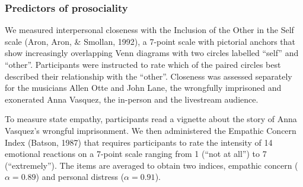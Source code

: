 \documentclass[
  man,floatsintext]{apa6}
\begin{document}
\subsubsection{Predictors of prosociality}\label{predictors-of-prosociality}

We measured interpersonal closeness with the Inclusion of the Other in the Self scale (Aron, Aron, \& Smollan, 1992), a 7-point scale with pictorial anchors that show increasingly overlapping Venn diagrams with two circles labelled ``self'' and ``other''. Participants were instructed to rate which of the paired circles best described their relationship with the ``other''. Closeness was assessed separately for the musicians Allen Otte and John Lane, the wrongfully imprisoned and exonerated Anna Vasquez, the in-person and the livestream audience.

To measure state empathy, participants read a vignette about the story of Anna Vasquez's wrongful imprisonment. We then administered the Empathic Concern Index (Batson, 1987) that requires participants to rate the intensity of 14 emotional reactions on a 7-point scale ranging from 1 (``not at all'') to 7 (``extremely''). The items are averaged to obtain two indices, empathic concern (\(\alpha = 0.89\)) and personal distress (\(\alpha = 0.91\)).
\end{document}

